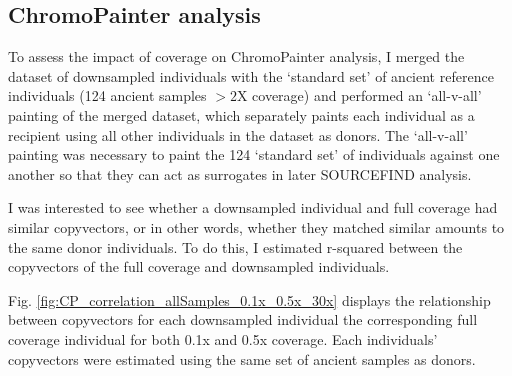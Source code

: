 \subsection{ChromoPainter analysis}

To assess the impact of coverage on ChromoPainter analysis, I merged the dataset of downsampled individuals with the `standard set' of ancient reference individuals (124 ancient samples $>2$X coverage) and performed an `all-v-all' painting of the merged dataset, which separately paints each individual as a recipient using all other individuals in the dataset as donors. The `all-v-all' painting was necessary to paint the 124 `standard set' of individuals against one another so that they can act as surrogates in later SOURCEFIND analysis. 

I was interested to see whether a downsampled individual and full coverage had similar copyvectors, or in other words, whether they matched similar amounts to the same donor individuals. To do this, I estimated r-squared between the copyvectors of the full coverage and downsampled individuals.

Fig. \ref{fig:CP_correlation_allSamples_0.1x_0.5x_30x} displays the relationship between copyvectors for each downsampled individual the corresponding full coverage individual for both 0.1x and 0.5x coverage. Each individuals' copyvectors were estimated using the same set of ancient samples as donors.

